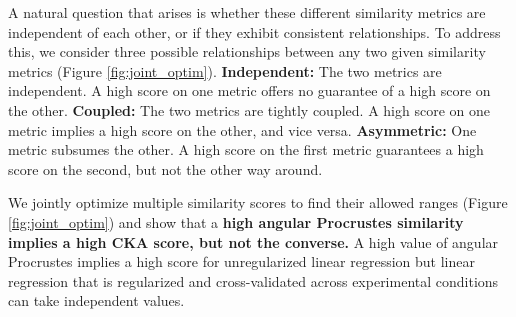 \documentclass{article} %
\begin{document}
A natural question that arises is whether these different similarity metrics are independent of each other, or if they exhibit consistent relationships. %
To address this, we consider three possible relationships between any two given similarity metrics (Figure \ref{fig:joint_optim}). \textbf{Independent:} The two metrics are independent. A high score on one metric offers no guarantee of a high score on the other.  \textbf{Coupled:} The two metrics are tightly coupled. A high score on one metric implies a high score on the other, and vice versa. \textbf{Asymmetric:}  One metric subsumes the other. A high score on the first metric guarantees a high score on the second, but not the other way around.

We jointly optimize multiple similarity scores to find their allowed ranges (Figure \ref{fig:joint_optim}) and show that a \textbf{high angular Procrustes similarity implies a high CKA score, but not the converse.} A high value of angular Procrustes implies a high score for unregularized linear regression but linear regression that is regularized and cross-validated across experimental conditions can take independent values.



\vspace{-0.1cm}%
\end{document}
